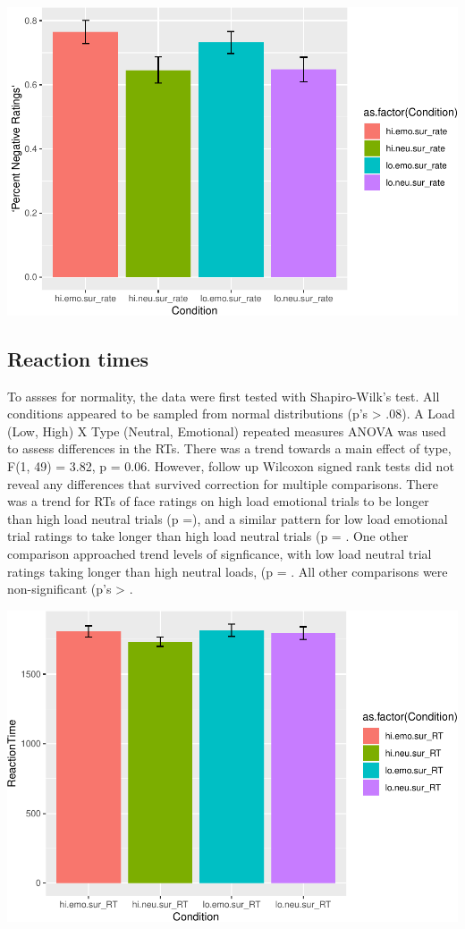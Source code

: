 \documentclass[man]{apa6}
\begin{document}
\includegraphics{Manuscript_files/figure-latex/plot figure 1-1.pdf}

\hypertarget{reaction-times}{%
\subsection{Reaction times}\label{reaction-times}}

To assses for normality, the data were first tested with Shapiro-Wilk's test. All conditions appeared to be sampled from normal distributions (p's \textgreater{} .08). A Load (Low, High) X Type (Neutral, Emotional) repeated measures ANOVA was used to assess differences in the RTs. There was a trend towards a main effect of type, F(1, 49) = 3.82, p = 0.06. However, follow up Wilcoxon signed rank tests did not reveal any differences that survived correction for multiple comparisons. There was a trend for RTs of face ratings on high load emotional trials to be longer than high load neutral trials (p =), and a similar pattern for low load emotional trial ratings to take longer than high load neutral trials (p = . One other comparison approached trend levels of signficance, with low load neutral trial ratings taking longer than high neutral loads, (p = . All other comparisons were non-significant (p's \textgreater{} .

\includegraphics{Manuscript_files/figure-latex/plot RT data-1.pdf}
\end{document}
